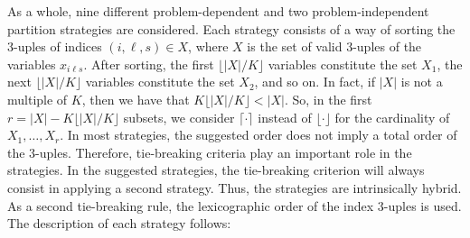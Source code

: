 \documentclass[11pt]{article}
\begin{document}
As a whole, nine different problem-dependent and two problem-independent partition strategies are considered. Each strategy consists of a way of sorting the 3-uples of indices $(i,\ell,s) \in X$, where $X$ is the set of valid 3-uples of the variables $x_{i \ell s}$. After sorting, the first $\lfloor |X|/K \rfloor$ variables constitute the set $X_1$, the next $\lfloor |X|/K \rfloor$ variables constitute the set $X_2$, and so on. In fact, if $|X|$ is not a multiple of $K$, then we have that $K \lfloor |X| / K \rfloor < |X|$. So, in the first $r = |X| - K \lfloor |X| / K \rfloor$ subsets, we consider $\lceil \cdot \rceil$ instead of $\lfloor \cdot \rfloor$ for the cardinality of $X_1, \dots, X_r$. In most strategies, the suggested order does not imply a total order of the 3-uples. Therefore, tie-breaking criteria play an important role in the strategies. In the suggested strategies, the tie-breaking criterion will always consist in applying a second strategy. Thus, the strategies are intrinsically hybrid. As a second tie-breaking rule, the lexicographic order of the index 3-uples is used. The description of each strategy follows:
\end{document}

